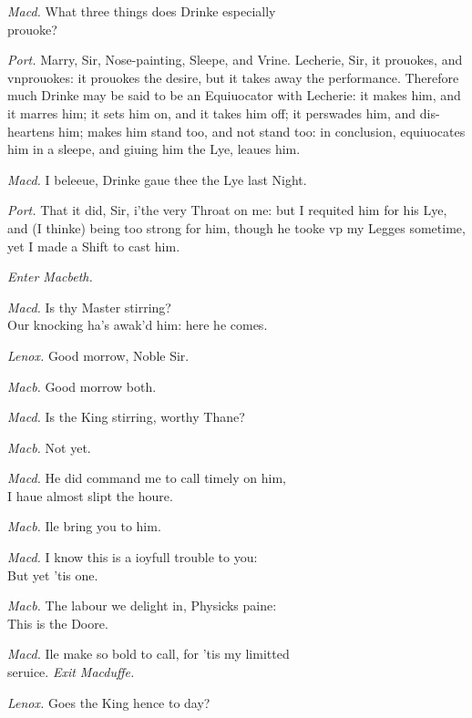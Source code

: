 \documentclass[12pt]{sides}
\newcommand{\clStageDir}[1]{\hspace*{\fill}\textit{#1}\hspace*{\fill}}
\newcommand{\elStageDir}[1]{\hfill\textit{#1}}
\newcommand{\dia}[1]{\hskip 15pt\textit{#1}\hskip 6pt}
\begin{document}
\begin{multicols}{2}
            \dia{Macd.} What three things does Drinke especially \\ prouoke?

            \dia{Port.} Marry, Sir, Nose-painting, Sleepe, and Vrine. Lecherie, Sir, it prouokes, and vnprouokes: it prouokes the desire, but it takes away the performance. Therefore much Drinke may be said to be an Equiuocator with Lecherie: it makes him, and it marres him; it sets him on, and it takes him off; it perswades him, and dis-heartens him; makes him stand too, and not stand too: in conclusion, equiuocates him in a sleepe, and giuing him the Lye, leaues him.

            \dia{Macd.} I beleeue, Drinke gaue thee the Lye last Night.

            \dia{Port.} That it did, Sir, i'the very Throat on me: but I requited him for his Lye, and (I thinke) being too strong for him, though he tooke vp my Legges sometime, yet I made a Shift to cast him.
            
            \clStageDir{Enter Macbeth.}
            
            \dia{Macd.} Is thy Master stirring? \\ Our knocking ha's awak'd him: here he comes.

            \dia{Lenox.} Good morrow, Noble Sir.

            \dia{Macb.} Good morrow both.

            \dia{Macd.} Is the King stirring, worthy Thane?

            \dia{Macb.} Not yet.

            \dia{Macd.} He did command me to call timely on him, \\ I haue almost slipt the houre.

            \dia{Macb.} Ile bring you to him.

            \dia{Macd.} I know this is a ioyfull trouble to you: \\ But yet 'tis one.

            \dia{Macb.} The labour we delight in, Physicks paine: \\ This is the Doore.

            \dia{Macd.} Ile make so bold to call, for 'tis my limitted \\ seruice. \elStageDir{Exit Macduffe.} \hspace{64pt}

            \dia{Lenox.} Goes the King hence to day?


\end{multicols}
\end{document}
